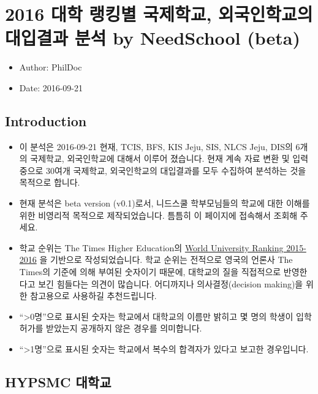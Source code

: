 \documentclass[13pt,]{article}
\title{}
\author{}
\date{}
\providecommand{\tightlist}{%
  \setlength{\itemsep}{0pt}\setlength{\parskip}{0pt}}
\begin{document}
{
\setcounter{tocdepth}{2}
\tableofcontents
}
\section{2016 대학 랭킹별 국제학교, 외국인학교의 대입결과 분석 by
NeedSchool (beta)}\label{------by-needschool-beta}

\begin{itemize}
\tightlist
\item
  Author: PhilDoc
\item
  Date: 2016-09-21
\end{itemize}

\subsection{Introduction}\label{introduction}

\begin{itemize}
\tightlist
\item
  이 분석은 2016-09-21 현재, TCIS, BFS, KIS Jeju, SIS, NLCS Jeju, DIS의
  6개의 국제학교, 외국인학교에 대해서 이루어 졌습니다. 현재 계속 자료
  변환 및 입력중으로 30여개 국제학교, 외국인학교의 대입결과를 모두
  수집하여 분석하는 것을 목적으로 합니다.
\item
  현재 분석은 beta version (v0.1)로서, 니드스쿨 학부모님들의 학교에 대한
  이해를 위한 비영리적 목적으로 제작되었습니다. 틈틈히 이 페이지에
  접속해서 조회해 주세요.
\item
  학교 순위는 The Times Higher Education의
  \href{https://www.timeshighereducation.com/world-university-rankings/2016/world-ranking}{World
  University Ranking 2015-2016} 을 기반으로 작성되었습니다. 학교 순위는
  전적으로 영국의 언론사 The Times의 기준에 의해 부여된 숫자이기 때문에,
  대학교의 질을 직접적으로 반영한다고 보긴 힘들다는 의견이 많습니다.
  어디까지나 의사결정(decision making)을 위한 참고용으로 사용하길
  추천드립니다.
\item
  ``\textgreater{}0명''으로 표시된 숫자는 학교에서 대학교의 이름만
  밝히고 몇 명의 학생이 입학허가를 받았는지 공개하지 않은 경우를
  의미합니다.
\item
  ``\textgreater{}1명''으로 표시된 숫자는 학교에서 복수의 합격자가
  있다고 보고한 경우입니다.
\end{itemize}

\subsection{HYPSMC 대학교}\label{hypsmc-}
\end{document}
